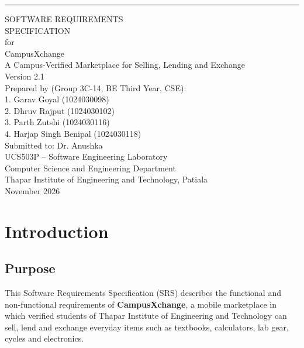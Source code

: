 \documentclass[11pt,a4paper]{scrreprt}
\def\myversion{2.1}
\begin{document}
\begin{titlepage}
\begin{flushright}
    \rule{16cm}{5pt}\vskip1cm
    \begin{bfseries}
        \Huge{SOFTWARE REQUIREMENTS\\ SPECIFICATION}\\
        \vspace{1.2cm}
        for\\
        \vspace{1.2cm}
        CampusXchange\\[0.3cm]
        \Large{A Campus-Verified Marketplace for Selling, Lending and Exchange}\\
        \vspace{1.2cm}
        \LARGE{Version \myversion}\\
        \vspace{1.2cm}
        \large
        Prepared by (Group 3C-14, BE Third Year, CSE):\\[0.2cm]
        1. Garav Goyal (1024030098)\\
        2. Dhruv Rajput (1024030102)\\
        3. Parth Zutshi (1024030116)\\
        4. Harjap Singh Benipal (1024030118)\\
        \vspace{1.2cm}
        Submitted to: Dr. Anushka\\
        UCS503P -- Software Engineering Laboratory\\
        \vspace{1.2cm}
        Computer Science and Engineering Department\\
        Thapar Institute of Engineering and Technology, Patiala\\
        \vspace{0.8cm}
        November 2026\\
    \end{bfseries}
\end{flushright}
\end{titlepage}

\tableofcontents

\chapter{Introduction}

\section{Purpose}
This Software Requirements Specification (SRS) describes the functional and
non-functional requirements of \textbf{CampusXchange}, a mobile marketplace
in which verified students of Thapar Institute of Engineering and Technology
can sell, lend and exchange everyday items such as textbooks, calculators,
lab gear, cycles and electronics.
\end{document}
